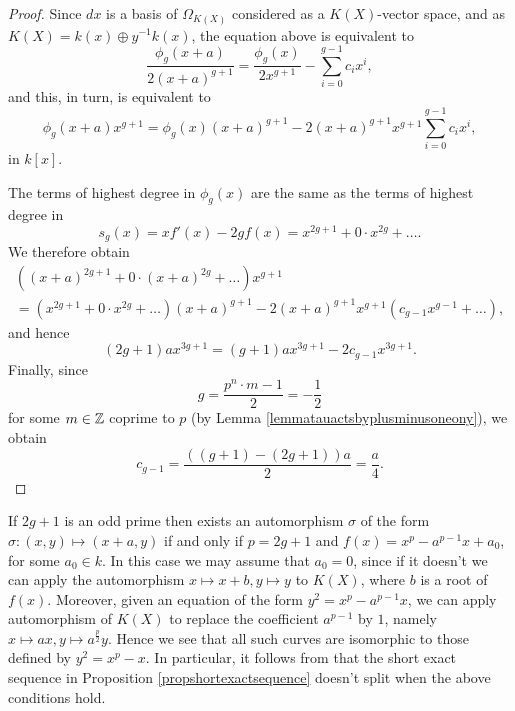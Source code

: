 \begin{proof}
    Since $dx$ is a basis of $\Omega_{K(X)}$ considered as a $K(X)$-vector space, and as $K(X) = k(x) \oplus y^{-1}k(x)$, the equation above is equivalent to
        \[
        \frac{\phi_g(x+a)}{2(x+a)^{g+1}} = \frac{\phi_g(x)}{2x^{g+1}} - \sum_{i=0}^{g-1} c_i x^i,
        \]
    and this, in turn, is equivalent to
        \[
        \phi_g(x+a)x^{g+1} = \phi_g(x)(x+a)^{g+1} - 2(x+a)^{g+1}x^{g+1}\sum_{i=0}^{g-1}c_i x^i,
        \]
    in $k[x]$.

    The terms of highest degree in $\phi_g(x)$ are the same as the terms of highest degree in 
        \[
        s_g(x) = xf'(x) - 2gf(x) = x^{2g+1} + 0\cdot x^{2g} + \ldots.
        \]
    We therefore obtain
        \begin{multline*}
        \left( (x+a)^{2g+1} + 0 \cdot (x+a)^{2g} + \ldots \right) x^{g+1}  \\ = (x^{2g+1} + 0 \cdot x^{2g} + \ldots )(x+a)^{g+1} - 2(x+a)^{g+1}x^{g+1}(c_{g-1}x^{g-1} + \ldots ),
        \end{multline*}
    and hence
        \[
        (2g+1)ax^{3g+1} = (g+1)ax^{3g+1} - 2c_{g-1}x^{3g+1}.
        \]
    Finally, since
        \[
        g = \frac{p^n\cdot m -1}{2} = -\frac{1}{2}
        \]
    for some $m\in {\mathbb Z}$ coprime to $p$ (by Lemma \ref{lemmatauactsbyplusminusoneony}), we obtain
        \[
        c_{g-1} = \frac{((g+1) - (2g+1))a}{2} = \frac{a}{4}.
        \]  
    \end{proof}

    \begin{ex}
    If $2g+1$ is an odd prime then exists an automorphism $\sigma$ of the form $\sigma\colon (x,y) \mapsto (x+a,y)$ if and only if $p=2g+1$ and $f(x) = x^p - a^{p-1}x + a_0$, for some $a_0 \in k$.
    In this case we may assume that $a_0 = 0$, since if it doesn't we can apply the automorphism $x \mapsto x+b, y\mapsto y$ to $K(X)$, where $b$ is a root of $f(x)$.
    Moreover, given an equation of the form $y^2 = x^p - a^{p-1}x$, we can apply automorphism of $K(X)$ to replace the coefficient $a^{p-1}$ by $1$, namely $x \mapsto ax, y \mapsto a^{\frac{p}{2}}y$.
    Hence we see that all such curves are isomorphic to those defined by $y^2 = x^p - x$.
    In particular, it follows from \cite[Thm.\ 3.1]{canonicalrepresentation} that the short exact sequence in Proposition \ref{propshortexactsequence} doesn't split when the above conditions hold.
    \end{ex}



